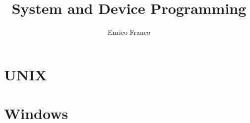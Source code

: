 \documentclass[a4paper, titlepage]{report}
\author{Enrico Franco}
\title{System and Device Programming}
\begin{document}

\tableofcontents

\part{UNIX}









\part{Windows}







\end{document}
